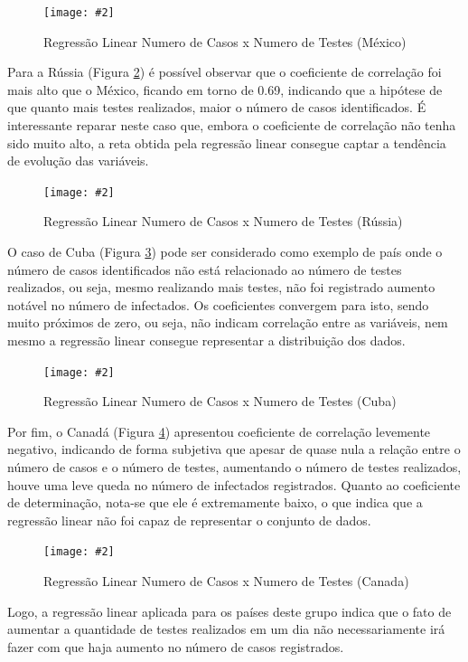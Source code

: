 \documentclass[a4paper,12pt]{article}
\newcommand{\image}[4]{
    \begin{figure}[H]%
        \begin{center}
        \caption{#3}
        \texttt{[image: \#2]}
        \label{#4}
        \end{center}
    \end{figure}
}
\begin{document}
\image{0.79}{images/regressao_linear/regressao_linear_NDCxNDT_MEX}{Regressão Linear Numero de Casos x Numero de Testes (México)}{figure:reg_mex}

\par Para a Rússia (Figura \ref{figure:reg_rus}) é possível observar que o coeficiente de correlação foi mais alto que o México, ficando em torno de 0.69, indicando que a hipótese de que quanto mais testes realizados, maior o número de casos identificados. É interessante reparar neste caso que, embora o coeficiente de correlação não tenha sido muito alto, a reta obtida pela regressão linear consegue captar a tendência de evolução das variáveis. 

\image{0.79}{images/regressao_linear/regressao_linear_NDCxNDT_RUS}{Regressão Linear Numero de Casos x Numero de Testes (Rússia)}{figure:reg_rus}

\par O caso de Cuba (Figura \ref{figure:reg_cub}) pode ser considerado como exemplo de país onde o número de casos identificados não está relacionado ao número de testes realizados, ou seja, mesmo realizando mais testes, não foi registrado aumento notável no número de infectados. Os coeficientes convergem para isto, sendo muito próximos de zero, ou seja, não indicam correlação entre as variáveis, nem mesmo a regressão linear consegue representar a distribuição dos dados.

\image{0.79}{images/regressao_linear/regressao_linear_NDCxNDT_CUB}{Regressão Linear Numero de Casos x Numero de Testes (Cuba)}{figure:reg_cub}

\par Por fim, o Canadá (Figura \ref{figure:reg_can}) apresentou coeficiente de correlação levemente negativo, indicando de forma subjetiva que apesar de quase nula a relação entre o número de casos e o número de testes, aumentando o número de testes realizados, houve uma leve queda no número de infectados registrados. Quanto ao coeficiente de determinação, nota-se que ele é extremamente baixo, o que indica que a regressão linear não foi capaz de representar o conjunto de dados. 

\image{0.79}{images/regressao_linear/regressao_linear_NDCxNDT_CAN}{Regressão Linear Numero de Casos x Numero de Testes (Canada)}{figure:reg_can}

\par Logo, a regressão linear aplicada para os países deste grupo indica que o fato de aumentar a quantidade de testes realizados em um dia não necessariamente irá fazer com que haja aumento no número de casos registrados. 
\end{document}
